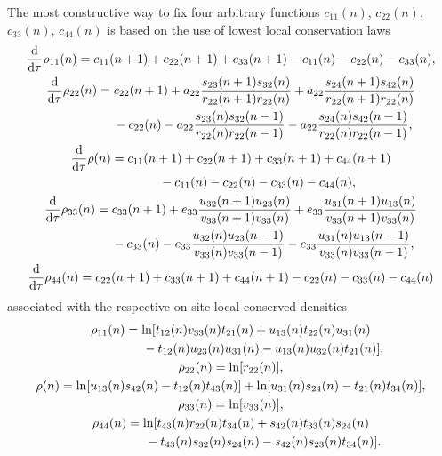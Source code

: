 \documentclass[pdftex]{sigma}
\numberwithin{equation}{section}
\begin{document}
The most constructive way to fix four arbitrary functions $c_{11}(n)$, $c_{22}(n)$, $c_{33}(n)$, $c_{44}(n)$ is based on the use of lowest local conservation laws
\begin{gather}\label{eq-4.1}
 \frac{\mathrm{d}}{\mathrm{d}\tau}\rho_{11}(n)=c_{11}(n+1)+c_{22}(n+1)+c_{33}(n+1) -c_{11}(n)-c_{22}(n)-c_{33}(n),
\\
 \frac{\mathrm{d}}{\mathrm{d}\tau}\rho_{22}(n)=c_{22}(n+1) + a_{22}\frac{s_{23}(n+1)s_{32}(n)}{r_{22}(n+1)r_{22}(n)} + a_{22}\frac{s_{24}(n+1)s_{42}(n)}{r_{22}(n+1)r_{22}(n)}\nonumber\\
 \hphantom{\frac{\mathrm{d}}{\mathrm{d}\tau}\rho_{22}(n)=}{}
 -c_{22}(n)-a_{22}\frac{s_{23}(n)s_{32}(n-1)}{r_{22}(n)r_{22}(n-1)}- a_{22}\frac{s_{24}(n)s_{42}(n-1)}{r_{22}(n)r_{22}(n-1)}, \label{eq-4.2}
\\
 \frac{\mathrm{d}}{\mathrm{d}\tau}\rho(n)=c_{11}(n+1)+c_{22}(n+1)+c_{33}(n+1)+c_{44}(n+1)\nonumber\\
 \hphantom{\frac{\mathrm{d}}{\mathrm{d}\tau}\rho(n)=}{}
 -c_{11}(n)-c_{22}(n)-c_{33}(n)-c_{44}(n),\label{eq-4.3}
\\
 \frac{\mathrm{d}}{\mathrm{d}\tau}\rho_{33}(n)=c_{33}(n+1) + e_{33}\frac{u_{32}(n+1)u_{23}(n)}{v_{33}(n+1)v_{33}(n)} + e_{33}\frac{u_{31}(n+1)u_{13}(n)}{v_{33}(n+1)v_{33}(n)}\nonumber\\
 \hphantom{\frac{\mathrm{d}}{\mathrm{d}\tau}\rho_{33}(n)=}{}
 -c_{33}(n)-e_{33}\frac{u_{32}(n)u_{23}(n-1)}{v_{33}(n)v_{33}(n-1)}- e_{33}\frac{u_{31}(n)u_{13}(n-1)}{v_{33}(n)v_{33}(n-1)}, \label{eq-4.4}
\\
 \frac{\mathrm{d}}{\mathrm{d}\tau}\rho_{44}(n)=c_{22}(n+1)+c_{33}(n+1)+c_{44}(n+1) -c_{22}(n)-c_{33}(n)-c_{44}(n) \label{eq-4.5}
\end{gather}
associated with the respective on-site local conserved densities
\begin{gather}
 \rho_{11}(n)=\ln[t_{12}(n)v_{33}(n)t_{21}(n)+u_{13}(n)t_{22}(n)u_{31}(n)\nonumber\\
 \hphantom{\rho_{11}(n)=\ln[}{}
	-t_{12}(n)u_{23}(n)u_{31}(n)-u_{13}(n)u_{32}(n)t_{21}(n)], \label{eq-4.6}
\\
	\rho_{22}(n)=\ln[r_{22}(n)], \label{eq-4.7}
\\
	\rho(n)=\ln[u_{13}(n)s_{42}(n)-t_{12}(n)t_{43}(n)]+\ln[u_{31}(n)s_{24}(n)-t_{21}(n)t_{34}(n)], \label{eq-4.8}
\\
	\rho_{33}(n)=\ln[v_{33}(n)], \label{eq-4.9}
\\
	\rho_{44}(n)=\ln[t_{43}(n)r_{22}(n)t_{34}(n)+s_{42}(n)t_{33}(n)s_{24}(n)\nonumber\\
\hphantom{\rho_{44}(n)=\ln[}{}
	-t_{43}(n)s_{32}(n)s_{24}(n)-s_{42}(n)s_{23}(n)t_{34}(n)] . \label{eq-4.10}
\end{gather}
\end{document}
